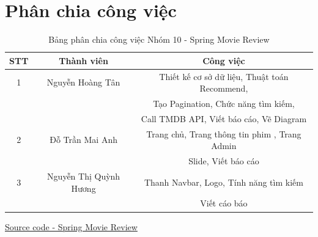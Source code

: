 \documentclass[12pt]{article}
\begin{document}
\section{Phân chia công việc}
\begin{table}[H]
    \centering
    \caption{Bảng phân chia công việc Nhóm 10 - Spring Movie Review}
    \begin{tabular}{|c|c|c|}
      \hline
      \textbf{STT} & \textbf{Thành viên} & \textbf{Công việc} \\
      \hline
      1 & Nguyễn Hoàng Tân & Thiết kế cơ sở dữ liệu, Thuật toán Recommend, \\
      & & Tạo Pagination, Chức năng tìm kiếm, \\
      & & Call TMDB API, Viết báo cáo, Vẽ Diagram \\
      \hline
      2 & Đỗ Trần Mai Anh & Trang chủ, Trang thông tin phim , Trang Admin \\
      & & Slide, Viết báo cáo \\
      \hline
      3 & Nguyễn Thị Quỳnh Hương & Thanh Navbar, Logo, Tính năng tìm kiếm \\
      & & Viết cáo báo \\
      \hline

    \end{tabular}
  \end{table}
  \begin{center}
  \href{https://github.com/Dev-Aligator/Spring-Movie-Review}{Source code - Spring Movie Review}
  \end{center}
\end{document}
